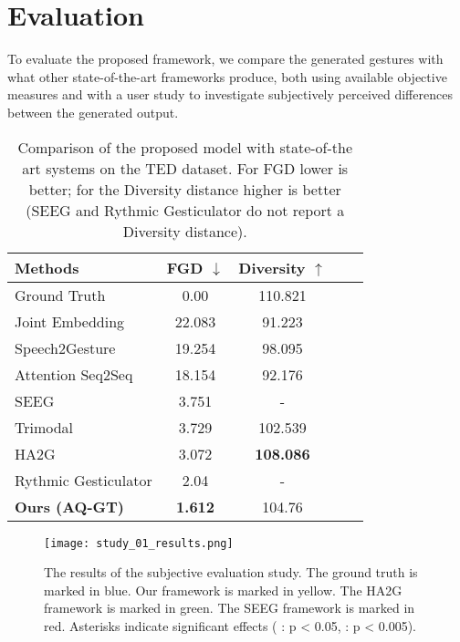 \documentclass[sigconf]{acmart}
\begin{document}
\section{Evaluation}
To evaluate the proposed framework, we compare the generated gestures with what other state-of-the-art frameworks produce, both using available objective measures and with a user study to investigate subjectively perceived differences between the generated output.

\begin{table}[b]
    \caption{Comparison of the proposed model with state-of-the art systems on the TED dataset. For FGD lower is better; for the Diversity distance higher is better (SEEG and Rythmic Gesticulator  do not report a Diversity distance).}
  \centering
  \begin{tabular}{lcccc}
    \toprule
    Methods & FGD $\downarrow$ & Diversity $\uparrow$ \\
    \midrule
    Ground Truth & 0.00 & 110.821 \\
    \midrule
     Joint Embedding \cite{ahujaLanguage2PoseNaturalLanguage2019}   & 22.083  & 91.223\\
     Speech2Gesture \cite{ginosarLearningIndividualStyles2019a}  & 19.254  & 98.095\\
     Attention Seq2Seq \cite{yoonRobotsLearnSocial2019a} & 18.154 & 92.176\\
     SEEG \cite{liangSEEGSemanticEnergized2022}   & 3.751 & -\\
     Trimodal \cite{yoonSpeechGestureGeneration2020}   & 3.729 & 102.539\\
     HA2G \cite{liuLearningHierarchicalCrossModal2022a}   & 3.072 & \textbf{108.086}\\
     Rythmic Gesticulator \cite{aoRhythmicGesticulatorRhythmAware2022a}  & 2.04 & -\\
     \midrule 
     \textbf{Ours (AQ-GT)} & \textbf{1.612} & 104.76\\
    \bottomrule
  \end{tabular}
  \label{tbl:ted_res}
\end{table}

\begin{figure*}[t]
  \centering
  \texttt{[image: study\_01\_results.png]}
  \caption{The results of the subjective evaluation study. The ground truth is marked in blue. Our framework is marked in yellow. The HA2G framework is marked in green. The SEEG framework is marked in red. Asterisks indicate significant effects (\text{*} : p < 0.05, \text{*}\text{*} : p < 0.005).}
  \label{fig:study_result}
\end{figure*}
\end{document}
